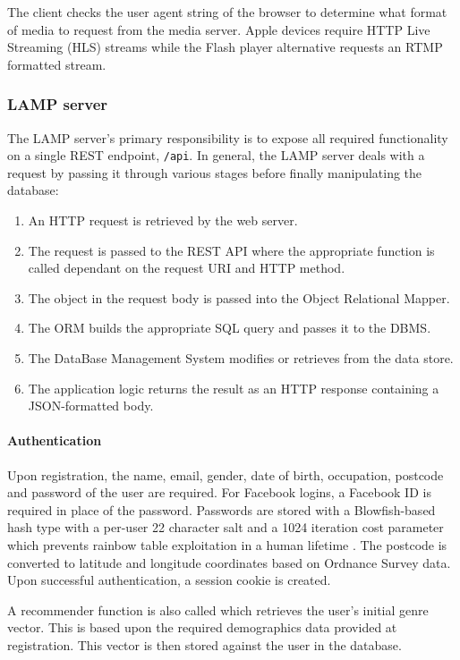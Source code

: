 The client checks the user agent string of the browser to determine what format of media to request from the media server. Apple devices require HTTP Live Streaming (HLS) streams while the Flash player alternative requests an RTMP formatted stream.

\subsubsection{LAMP server}

The LAMP server's primary responsibility is to expose all required functionality on a single REST endpoint, \texttt{/api}. In general, the LAMP server deals with a request by passing it through various stages before finally manipulating the database:

\begin{enumerate}
	\item An HTTP request is retrieved by the web server.
	\item The request is passed to the REST API where the appropriate function is called dependant on the request URI and HTTP method.
	\item The object in the request body is passed into the Object Relational Mapper.
	\item The ORM builds the appropriate SQL query and passes it to the DBMS.
	\item The DataBase Management System modifies or retrieves from the data store.
	\item The application logic returns the result as an HTTP response containing a JSON-formatted body.
\end{enumerate}

\paragraph{Authentication}

Upon registration, the name, email, gender, date of birth, occupation, postcode and password of the user are required. For Facebook logins, a Facebook ID is required in place of the password. Passwords are stored with a Blowfish-based hash type with a per-user 22 character salt and a 1024 iteration cost parameter which prevents rainbow table exploitation in a human lifetime \citep{hashing}. The postcode is converted to latitude and longitude coordinates based on Ordnance Survey data. Upon successful authentication, a session cookie is created.

A recommender function is also called which retrieves the user's initial genre vector. This is based upon the required demographics data provided at registration. This vector is then stored against the user in the database.

